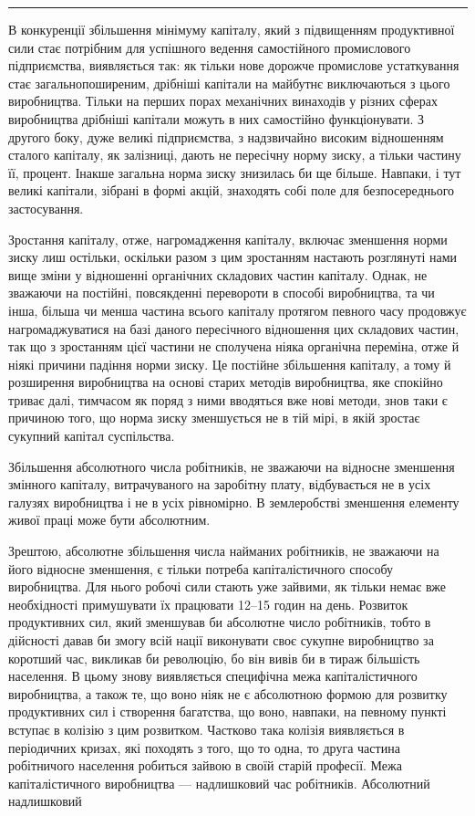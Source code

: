 \pfbreak{}

В конкуренції збільшення мінімуму капіталу, який з підвищенням
продуктивної сили стає потрібним для успішного ведення
самостійного промислового підприємства, виявляється
так: як тільки нове дорожче промислове устаткування стає
загальнопоширеним, дрібніші капітали на майбутнє виключаються
з цього виробництва. Тільки на перших порах механічних винаходів
у різних сферах виробництва дрібніші капітали можуть
в них самостійно функціонувати. З другого боку, дуже великі
підприємства, з надзвичайно високим відношенням сталого капіталу,
як залізниці, дають не пересічну норму зиску, а тільки
частину її, процент. Інакше загальна норма зиску знизилась би
ще більше. Навпаки, і тут великі капітали, зібрані в формі акцій,
знаходять собі поле для безпосереднього застосування.

Зростання капіталу, отже, нагромадження капіталу, включає
зменшення норми зиску лиш остільки, оскільки разом з цим зростанням
настають розглянуті нами вище зміни у відношенні органічних
складових частин капіталу. Однак, не зважаючи на постійні,
повсякденні перевороти в способі виробництва, та чи інша,
більша чи менша частина всього капіталу протягом певного
часу продовжує нагромаджуватися на базі даного пересічного відношення
цих складових частин, так що з зростанням цієї частини
не сполучена ніяка органічна переміна, отже й ніякі причини
падіння норми зиску. Це постійне збільшення капіталу, а тому
й розширення виробництва на основі старих методів виробництва,
яке спокійно триває далі, тимчасом як поряд з ними
вводяться вже нові методи, знов таки є причиною того, що
норма зиску зменшується не в тій мірі, в якій зростає сукупний
капітал суспільства.

Збільшення абсолютного числа робітників, не зважаючи на
відносне зменшення змінного капіталу, витрачуваного на заробітну
плату, відбувається не в усіх галузях виробництва і не
в усіх рівномірно. В землеробстві зменшення елементу живої
праці може бути абсолютним.

Зрештою, абсолютне збільшення числа найманих робітників,
не зважаючи на його відносне зменшення, є тільки потреба капіталістичного
способу виробництва. Для нього робочі сили
стають уже зайвими, як тільки немає вже необхідності примушувати
їх працювати 12--15 годин на день. Розвиток продуктивних
сил, який зменшував би абсолютне число робітників, тобто
в дійсності давав би змогу всій нації виконувати своє сукупне
виробництво за коротший час, викликав би революцію, бо він
вивів би в тираж більшість населення. В цьому знову виявляється
специфічна межа капіталістичного виробництва, а також
те, що воно ніяк не є абсолютною формою для розвитку продуктивних
сил і створення багатства, що воно, навпаки, на певному
пункті вступає в колізію з цим розвитком. Частково така колізія
виявляється в періодичних кризах, які походять з того, що
то одна, то друга частина робітничого населення робиться зайвою
в своїй старій професії. Межа капіталістичного виробництва
— надлишковий час робітників. Абсолютний надлишковий
\parbreak{}  %
